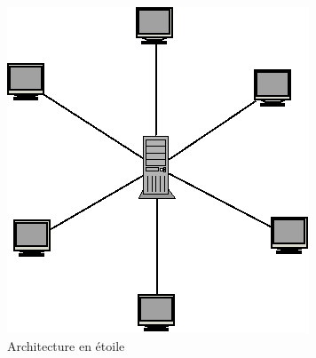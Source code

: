 \documentclass[a4paper,12pt]{article}
\begin{document}
\begin{figure}[!h]
  \begin{center}
    \includegraphics[scale=.3]{architecture.png}
  \end{center}
  \caption{Architecture en étoile}
\end{figure}

\newpage
\end{document}
